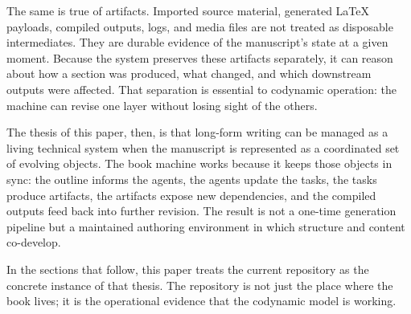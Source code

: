 The same is true of artifacts. Imported source material, generated LaTeX payloads, compiled outputs, logs, and media files are not treated as disposable intermediates. They are durable evidence of the manuscript's state at a given moment. Because the system preserves these artifacts separately, it can reason about how a section was produced, what changed, and which downstream outputs were affected. That separation is essential to codynamic operation: the machine can revise one layer without losing sight of the others.

The thesis of this paper, then, is that long-form writing can be managed as a living technical system when the manuscript is represented as a coordinated set of evolving objects. The book machine works because it keeps those objects in sync: the outline informs the agents, the agents update the tasks, the tasks produce artifacts, the artifacts expose new dependencies, and the compiled outputs feed back into further revision. The result is not a one-time generation pipeline but a maintained authoring environment in which structure and content co-develop.

In the sections that follow, this paper treats the current repository as the concrete instance of that thesis. The repository is not just the place where the book lives; it is the operational evidence that the codynamic model is working.

